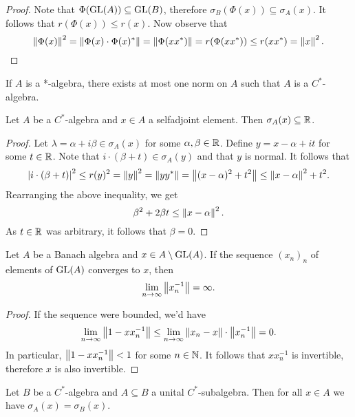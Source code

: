 \begin{proof}
Note that $\Phi(\operatorname{GL}(A)) \subseteq \operatorname{GL}(B)$, therefore
$\sigma_B(\Phi(x)) \subseteq \sigma_A(x)$. It follows that
$r(\Phi(x)) \leq r(x)$. Now observe that
\[
\left\lVert \Phi(x)\right\rVert^2 =
\left\lVert \Phi(x) \cdot \Phi(x)^*\right\rVert =
\left\lVert \Phi(xx^*)\right\rVert =
r(\Phi(xx^*)) \leq
r(xx^*) =
\left\lVert x\right\rVert^2. \qedhere
\]
\end{proof}

\begin{posledica}
If $A$ is a *-algebra, there exists at most one norm on $A$ such
that $A$ is a $C^*$-algebra.
\end{posledica}

\obvs

\begin{lema}
Let $A$ be a $C^*$-algebra and $x \in A$ a selfadjoint element.
Then $\sigma_A(x) \subseteq \mathbb{R}$.
\end{lema}

\begin{proof}
Let $\lambda = \alpha + i \beta \in \sigma_A(x)$ for some
$\alpha, \beta \in \mathbb{R}$. Define $y = x - \alpha + it$ for some
$t \in \mathbb{R}$. Note that $i \cdot (\beta + t) \in \sigma_A(y)$ and
that $y$ is normal. It follows  that
\[
\left\lvert i \cdot (\beta + t)\right\rvert^2 \leq
r(y)^2 =
\left\lVert y\right\rVert^2 =
\left\lVert y y^*\right\rVert =
\left\lVert (x - \alpha)^2 + t^2\right\rVert \leq
\left\lVert x - \alpha\right\rVert^2 + t^2.
\]
Rearranging the above inequality, we get
\[
\beta^2 + 2 \beta t \leq \left\lVert x - \alpha\right\rVert^2.
\]
As $t \in \mathbb{R}$ was arbitrary, it follows that $\beta = 0$.
\end{proof}

\begin{lema}
Let $A$ be a Banach algebra and $x \in A \setminus \operatorname{GL}(A)$. If the
sequence $(x_n)_n$ of elements of $\operatorname{GL}(A)$ converges to $x$, then
\[
\lim_{n \to \infty} \left\lVert x_n^{-1}\right\rVert = \infty.
\]
\end{lema}

\begin{proof}
If the sequence were bounded, we'd have
\[
\lim_{n \to \infty} \left\lVert 1 - x x_n^{-1}\right\rVert \leq
\lim_{n \to \infty} \left\lVert x_n - x\right\rVert \cdot \left\lVert x_n^{-1}\right\rVert = 0.
\]
In particular, $\left\lVert 1 - x x_n^{-1}\right\rVert < 1$ for some $n \in \mathbb{N}$.
It follows that $x x_n^{-1}$ is invertible, therefore $x$ is also
invertible.
\end{proof}

\begin{trditev}
Let $B$ be a $C^*$-algebra and $A \subseteq B$ a unital
$C^*$-subalgebra. Then for all $x \in A$ we have
$\sigma_A(x) = \sigma_B(x)$.
\end{trditev}

